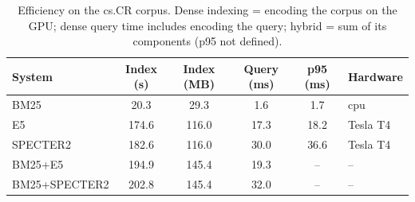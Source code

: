 \begin{table}[t]
\centering
\small
\caption{Efficiency on the cs.CR corpus. Dense indexing = encoding the corpus on the GPU; dense query time includes encoding the query; hybrid = sum of its components (p95 not defined).}
\label{tab:eff}
\begin{tabular}{lccccl}
\toprule
System & Index (s) & Index (MB) & Query (ms) & p95 (ms) & Hardware \\
\midrule
BM25 & 20.3 & 29.3 & 1.6 & 1.7 & cpu \\
E5 & 174.6 & 116.0 & 17.3 & 18.2 & Tesla T4 \\
SPECTER2 & 182.6 & 116.0 & 30.0 & 36.6 & Tesla T4 \\
BM25+E5 & 194.9 & 145.4 & 19.3 & -- & -- \\
BM25+SPECTER2 & 202.8 & 145.4 & 32.0 & -- & -- \\
\bottomrule
\end{tabular}
\end{table}
